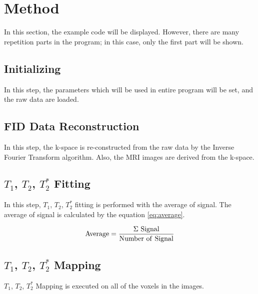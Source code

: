\documentclass[10pt, a4paper]{article}
\begin{document}
	\section{Method}
		In this section, the example code will be displayed. However, there are many repetition parts in the program; in this case, only the first part will be shown. 
	
		\subsection{Initializing}
			In this step, the parameters which will be used in entire program will be set, and the raw data are loaded. 
			
			
	
		\subsection{FID Data Reconstruction}
			In this step, the k-space is re-constructed from the raw data by the Inverse Fourier Transform algorithm. Also, the MRI images are derived from the k-space. 
		
			
		
		\subsection{$T_1$, $T_2$, $T_2^*$ Fitting}
			In this step, $T_1$, $T_2$, $T_2^*$ fitting is performed with the average of signal. The average of signal is calculated by the equation \ref{eq:average}.
			
			\begin{equation}
				\rm{Average} = \frac{\Sigma \ Signal}{\rm{Number \ of \ Signal}}
				\label{eq:average}
			\end{equation}
		
			
		
		\subsection{$T_1$, $T_2$, $T_2^*$ Mapping}
			$T_1$, $T_2$, $T_2^*$ Mapping is executed on all of the voxels in the images. 
		
			
		
\end{document}

